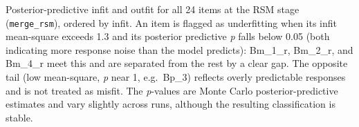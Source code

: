 \documentclass[
  man,
  floatsintext,
  longtable,
  nolmodern,
  notxfonts,
  notimes,
  colorlinks=true,linkcolor=blue,citecolor=blue,urlcolor=blue]{apa7}
\begin{document}
\begin{table}

{\caption{{Posterior-predictive infit and outfit for all 24 items at the
RSM stage (\texttt{merge\_rsm}), ordered by infit. An item is flagged as
underfitting when its infit mean-square exceeds 1.3 and its posterior
predictive \emph{p} falls below 0.05 (both indicating more response
noise than the model predicts): Bm\_1\_r, Bm\_2\_r, and Bm\_4\_r meet
this and are separated from the rest by a clear gap. The opposite tail
(low mean-square, \emph{p} near 1, e.g.~Bp\_3) reflects overly
predictable responses and is not treated as misfit. The \emph{p}-values
are Monte Carlo posterior-predictive estimates and vary slightly across
runs, although the resulting classification is
stable.}{\label{tbl-itemfit}}}
\vspace{-20pt}}


\end{table}
\end{document}
